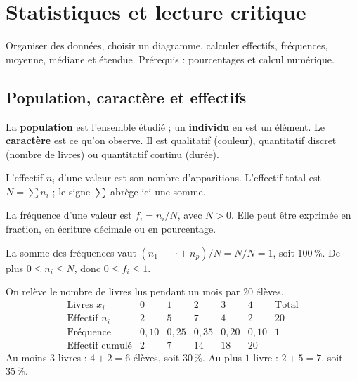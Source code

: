 \documentclass[../cours_3e.tex]{subfiles}
\begin{document}
\setcounter{chapter}{9}
\chapter{Statistiques et lecture critique}
\label{ch:statistiques}
\begin{objectif}
Organiser des données, choisir un diagramme, calculer effectifs, fréquences, moyenne, médiane et étendue. Prérequis : pourcentages et calcul numérique.
\end{objectif}
\section{Population, caractère et effectifs}
\begin{definition}
La \textbf{population} est l'ensemble étudié ; un \textbf{individu} en est un élément. Le \textbf{caractère} est ce qu'on observe. Il est qualitatif (couleur), quantitatif discret (nombre de livres) ou quantitatif continu (durée).
\end{definition}
L'effectif $n_i$ d'une valeur est son nombre d'apparitions. L'effectif total est $N=\sum n_i$ ; le signe $\sum$ abrège ici une somme.
\begin{definition}
La fréquence d'une valeur est $f_i=n_i/N$, avec $N>0$. Elle peut être exprimée en fraction, en écriture décimale ou en pourcentage.
\end{definition}
\begin{demonstration}
La somme des fréquences vaut $(n_1+\cdots+n_p)/N=N/N=1$, soit $100\,\%$. De plus $0\leq n_i\leq N$, donc $0\leq f_i\leq1$.
\end{demonstration}
\begin{exemple}
On relève le nombre de livres lus pendant un mois par $20$ élèves.
\[
\begin{array}{c|rrrrr|r}
\text{Livres }x_i&0&1&2&3&4&\text{Total}\\\hline
\text{Effectif }n_i&2&5&7&4&2&20\\
\text{Fréquence}&0{,}10&0{,}25&0{,}35&0{,}20&0{,}10&1\\
\text{Effectif cumulé}&2&7&14&18&20&
\end{array}
\]
Au moins $3$ livres : $4+2=6$ élèves, soit $30\,\%$. Au plus $1$ livre : $2+5=7$, soit $35\,\%$.
\end{exemple}
\end{document}
